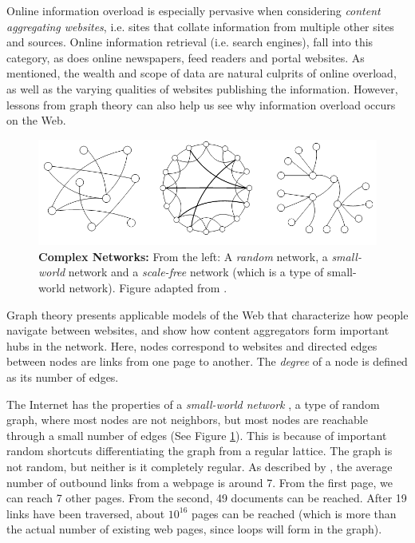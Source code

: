 Online information overload is especially pervasive when considering \emph{content aggregating websites}, 
i.e. sites that collate information from multiple other sites and sources. 
Online information retrieval (i.e. search engines), fall into this category, as does
online newspapers, feed readers and portal websites.
As mentioned, the wealth and scope of data are natural culprits of online overload, 
as well as the varying qualities of websites publishing the information. 
However, lessons from graph theory can also help us see why information overload occurs on the Web.

\begin{figure}[t]
  \includegraphics[width=\textwidth]{../graphics/graphs}
  \caption[Complex Networks]{
    \textbf{Complex Networks:} 
    From the left: A \emph{random} network, a \emph{small-world} network and a \emph{scale-free} network 
    (which is a type of  small-world network). Figure adapted from \cite{Huang2005}.} 
  \label{fig:swn}
\end{figure}

Graph theory presents applicable models of the Web that characterize how people navigate between websites, 
and show how content aggregators form important hubs in the network. Here, nodes correspond to websites and
directed edges between nodes are links from one page to another. The \emph{degree} of a node is defined as its number of edges.

The Internet has the properties of a \emph{small-world network} \citep{Newman2000}, 
a type of random graph, where most nodes are not neighbors, but most nodes are reachable through a small number of edges (See Figure \ref{fig:swn}). 
This is because of important random shortcuts differentiating the graph from a regular lattice. 
The graph is not  random, but neither is it completely regular.
As described by \citet[p37]{Barabasi2003}, the average number of outbound links from a webpage is around 7.
From the first page, we can reach 7 other pages. From the second, 49 documents can be reached. 
After 19 links have been traversed, about $10^{16}$ pages can be reached (which is more than the actual number of existing web pages, since loops will form in the graph).

